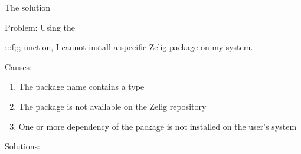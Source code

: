 \documentclass{article}
\newcommand{\code}[2]{

  :::#2;;;
}
\begin{document}
% 
% 
% 
% 
% 
% 
% 
% 
% 
% 

The solution


Problem: Using the \code{install.packages} function, I cannot install a specific Zelig package on my system.


Causes:

\begin{enumerate}
  \item The package name contains a type
  \item The package is not available on the Zelig repository
  \item One or more dependency of the package is not installed on the user's system
\end{enumerate}

Solutions:
\end{document}
